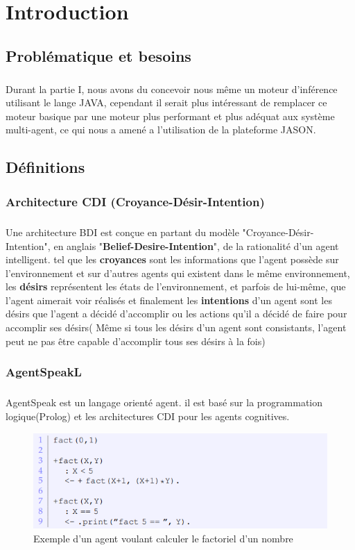 \setcounter{chapter}{0}
\chapter{Introduction}
\section{Problématique et besoins}
\paragraph{}
Durant la partie I, nous avons du concevoir nous même un moteur d'inférence utilisant le lange JAVA, cependant il serait plus intéressant de remplacer ce moteur basique par une moteur plus performant et plus adéquat aux système multi-agent, ce qui nous a amené a l'utilisation de la plateforme JASON.
\section{Définitions}
\subsection{Architecture CDI (Croyance-Désir-Intention)}
\paragraph{}
Une architecture BDI est conçue en partant du modèle "Croyance-Désir-Intention", en anglais "\textbf{Belief-Desire-Intention}", de la rationalité d'un agent intelligent. tel que les \textbf{croyances} sont les informations que l'agent possède sur l'environnement et sur d'autres agents qui existent dans le même environnement, les \textbf{désirs} représentent les états de l'environnement, et parfois de lui-même, que l'agent aimerait voir réalisés et finalement les \textbf{intentions} d'un agent sont les désirs que l'agent a décidé d'accomplir ou les actions qu'il a décidé de faire pour accomplir ses désirs( Même si tous les désirs d'un agent sont consistants, l'agent peut ne pas être capable d'accomplir tous ses désirs à la fois)
\subsection{AgentSpeakL}
\paragraph{}
AgentSpeak est un langage orienté agent. il est basé sur la programmation logique(Prolog) et les architectures CDI pour les agents cognitives.
\begin{figure}[H]
	\centering
	\includegraphics[width=\textwidth]{imgs/agenttSpeak.png}
	\caption{Exemple d'un agent voulant calculer le factoriel d'un nombre}
\end{figure}
